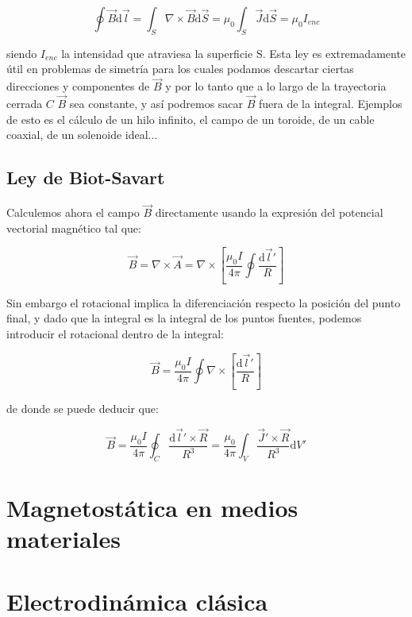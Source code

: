 \documentclass[12pt,a4paper]{article}
\newcommand{\ccorchetes}[1]{\left[ #1  \right]}
\newcommand{\D}{\mathrm{d}}
\newcommand{\rota}{\nabla \times}
\begin{document}
\begin{equation}
\oint \vec{B} \D \vec{l} = \int_S \rota \vec{B} \D \vec{S} = \mu_0 \int_S \vec{J} \D \vec{S} = \mu_0 I_{enc}
\end{equation}

siendo $I_{enc}$ la intensidad que atraviesa la superficie S. Esta ley es extremadamente útil en problemas de simetría para los cuales podamos descartar ciertas direcciones y componentes de $\vec{B}$ y por lo tanto que a lo largo de la trayectoria cerrada $C$ $\vec{B}$ sea constante, y así podremos sacar $\vec{B}$ fuera de la integral. Ejemplos de esto es el cálculo de un hilo infinito, el campo de un toroide, de un cable coaxial, de un solenoide ideal...


\subsection{Ley de Biot-Savart}

Calculemos ahora el campo $\vec{B}$ directamente usando la expresión del potencial vectorial magnético tal que:

$$ \vec{B} = \rota \vec{A} = \rota \ccorchetes{\dfrac{\mu_0 I}{4 \pi} \oint \dfrac{\D \vec{l}'}{R}} $$

Sin embargo el rotacional implica la diferenciación respecto la posición del punto final, y dado que la integral es la integral de los puntos fuentes, podemos introducir el rotacional dentro de la integral:

$$ \vec{B} = \dfrac{\mu_0 I}{4 \pi} \oint  \rota \ccorchetes{\dfrac{\D \vec{l}'}{R}} $$


de donde se puede deducir que:

\begin{equation}
\vec{B} =  \dfrac{\mu_0 I}{4 \pi} \oint_C  \dfrac{\D \vec{l}' \times \vec{R}}{R^3} = \dfrac{\mu_0 }{4 \pi} \int_V  \dfrac{\vec{J}' \times \vec{R}}{R^3}  \D V'
\end{equation}




\newpage


\section{Magnetostática en medios materiales}
\newpage

\section{Electrodinámica clásica}
\end{document}

